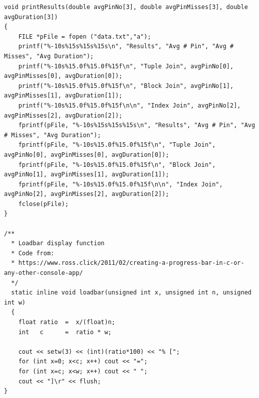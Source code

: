 \documentclass{article}
\begin{document}
\begin{lstlisting}
void printResults(double avgPinNo[3], double avgPinMisses[3], double avgDuration[3])
{
	FILE *pFile = fopen ("data.txt","a");
	printf("%-10s%15s%15s%15s\n", "Results", "Avg # Pin", "Avg # Misses", "Avg Duration"); 
	printf("%-10s%15.0f%15.0f%15f\n", "Tuple Join", avgPinNo[0], avgPinMisses[0], avgDuration[0]); 
	printf("%-10s%15.0f%15.0f%15f\n", "Block Join", avgPinNo[1], avgPinMisses[1], avgDuration[1]); 
	printf("%-10s%15.0f%15.0f%15f\n\n", "Index Join", avgPinNo[2], avgPinMisses[2], avgDuration[2]); 
	fprintf(pFile, "%-10s%15s%15s%15s\n", "Results", "Avg # Pin", "Avg # Misses", "Avg Duration"); 
	fprintf(pFile, "%-10s%15.0f%15.0f%15f\n", "Tuple Join", avgPinNo[0], avgPinMisses[0], avgDuration[0]); 
	fprintf(pFile, "%-10s%15.0f%15.0f%15f\n", "Block Join", avgPinNo[1], avgPinMisses[1], avgDuration[1]); 
	fprintf(pFile, "%-10s%15.0f%15.0f%15f\n\n", "Index Join", avgPinNo[2], avgPinMisses[2], avgDuration[2]); 
	fclose(pFile);
}

/**
  * Loadbar display function
  * Code from: 
  * https://www.ross.click/2011/02/creating-a-progress-bar-in-c-or-any-other-console-app/
  */
  static inline void loadbar(unsigned int x, unsigned int n, unsigned int w)
  {
  	float ratio  =  x/(float)n;
  	int   c      =  ratio * w;

  	cout << setw(3) << (int)(ratio*100) << "% [";
  	for (int x=0; x<c; x++) cout << "=";
  	for (int x=c; x<w; x++) cout << " ";
  	cout << "]\r" << flush;
}
\end{lstlisting}
\end{document}
